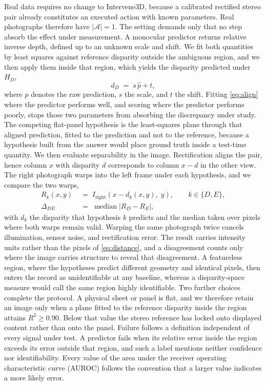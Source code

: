\documentclass{article} %
\theoremstyle{defstyle}
\theoremstyle{plain}
\begin{document}
Real data requires no change to Intervene3D, because a calibrated rectified stereo pair already
constitutes an executed action with known parameters. Real photographs therefore have
$|\mathcal{A}| = 1$. The setting demands only that no step absorb the effect under measurement.
A monocular predictor returns relative inverse depth, defined up to an unknown scale and shift.
We fit both quantities by least squares against reference disparity outside the ambiguous
region, and we then apply them inside that region, which yields the disparity predicted under
$H_D$,
\begin{equation}
\label{eq:align}
d_{D} \;=\; s\,\hat{p} + t ,
\end{equation}
where $\hat{p}$ denotes the raw prediction, $s$ the scale, and $t$ the shift. Fitting
\eqref{eq:align} where the predictor performs well, and scoring where the predictor performs
poorly, stops those two parameters from absorbing the discrepancy under study. The competing
flat-panel hypothesis is the least-squares plane through that aligned prediction, fitted to the
prediction and not to the reference, because a hypothesis built from the answer would place
ground truth inside a test-time quantity. We then evaluate separability in the image.
Rectification aligns the pair, hence column $x$ with disparity $d$ corresponds to column $x -
d$ in the other view. The right photograph warps into the left frame under each hypothesis, and
we compare the two warps,
\begin{align}
\label{eq:warp}
R_{k}(x, y) \;&=\; I_{\text{right}}\!\left(x - d_{k}(x,y),\; y\right),
\qquad k \in \{D, E\}, \\
\label{eq:delta-photometric}
\Delta_{DE} \;&=\; \operatorname{median}\left|R_{D} - R_{E}\right| ,
\end{align}
with $d_k$ the disparity that hypothesis $k$ predicts and the median taken over pixels where
both warps remain valid. Warping the same photograph twice cancels illumination, sensor noise,
and rectification error. The result carries intensity units rather than the pixels of
\eqref{eq:distance}, and a disagreement counts only where the image carries structure to reveal
that disagreement. A featureless region, where the hypotheses predict different geometry and
identical pixels, then enters the record as unidentifiable at any baseline, whereas a
disparity-space measure would call the same region highly identifiable. Two further choices
complete the protocol. A physical sheet or panel is flat, and we therefore retain an image only
when a plane fitted to the reference disparity inside the region attains $R^2 \geq 0.90$. Below
that value the stereo reference has locked onto displayed content rather than onto the panel.
Failure follows a definition independent of every signal under test. A predictor fails when its
relative error inside the region exceeds its error outside that region, and such a label
mentions neither confidence nor identifiability. Every value of the area under the receiver
operating characteristic curve (AUROC) follows the convention that a larger value indicates a
more likely error.
\end{document}
